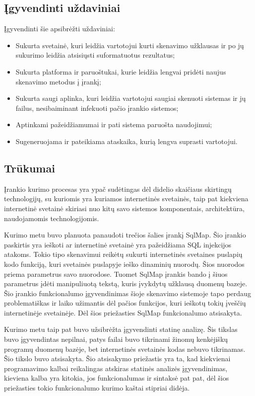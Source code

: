 \documentclass[a4paper,12pt,fleqn]{article}
\begin{document}
\subsection{Įgyvendinti uždaviniai}
\label{sec:example}
Įgyvendinti šie apsibrėžti uždaviniai: 
\begin{itemize}
	\item Sukurta svetainė, kuri leidžia vartotojui kurti skenavimo užklausas ir po jų sukurimo leidžia atsisiųsti suformatuotus rezultatus;
	\item Sukurta platforma ir paruoštukai, kurie leidžia lengvai pridėti naujus skenavimo metodus į įrankį;
	\item Sukurta saugi aplinka, kuri leidžia vartotojui saugiai skenuoti sistemas ir jų failus, nesibaiminant infekuoti pačio įrankio sistemos;
	\item Aptinkami pažeidžiamumai ir pati sistema paruošta naudojimui;
	\item Sugeneruojama ir pateikiama ataskaika, kurią lengva suprasti vartotojui.
\end{itemize}


\subsection{Trūkumai}
\label{sec:example}

Įrankio kurimo procesas yra ypač sudėtingas dėl didelio skaičiaus skirtingų technologijų, su kuriomis yra kuriamos internetinės svetainės, taip pat kiekviena internetinė svetainė skiriasi nuo kitų savo sistemos komponentais, architektūra, naudojamomis technologijomis.

Kurimo metu buvo planuota panaudoti trečios šalies įrankį SqlMap. Šio įrankio paskirtis yra ieškoti ar internetinė svetainė yra pažeidžiama SQL injekcijos atakoms. Tokio tipo skenavimui reikėtų sukurti internetinės svetaines puslapių kodo funkciją, kuri svetainės puslapyje ieško dinaminių nuorodų. Šios nuorodos priema parametrus savo nuorodose. Tuomet SqlMap įrankis bando į šiuos parametrus įdėti manipuliuotą tekstą, kuris įvykdytų užklausą duomenų bazeje. Šio įrankio funkcionalumo įgyvendinimas šioje skenavimo sistemoje tapo perdaug problematiškas ir laiko užimantis dėl pačios funkcijos, kuri ieškotų tokių įveščių internetinėje svetainėje. Dėl šios priežasties SqlMap funkcionalumo atsisakyta.

Kurimo metu taip pat buvo užsibrėžta įgyvendinti statinę analizę. Šis tikslas buvo įgyvendintas nepilnai, patys failai buvo tikrinami žinomų kenkėjiškų programų duomenų bazėje, bet internetinės svetainės kodas nebuvo tikrinamas. Šio tikslo buvo atsisakyta. Šio atsisakymo priežastis yra ta, kad kiekvienai programavimo kalbai reikalingas atskiras statinės analizės įgyvendinimas, kieviena kalba yra kitokia, jos funkcionalumas ir sintaksė pat pat, dėl šios priežasties tokio funkcionalumo kurimo kaštai stipriai didėja.
\end{document}
